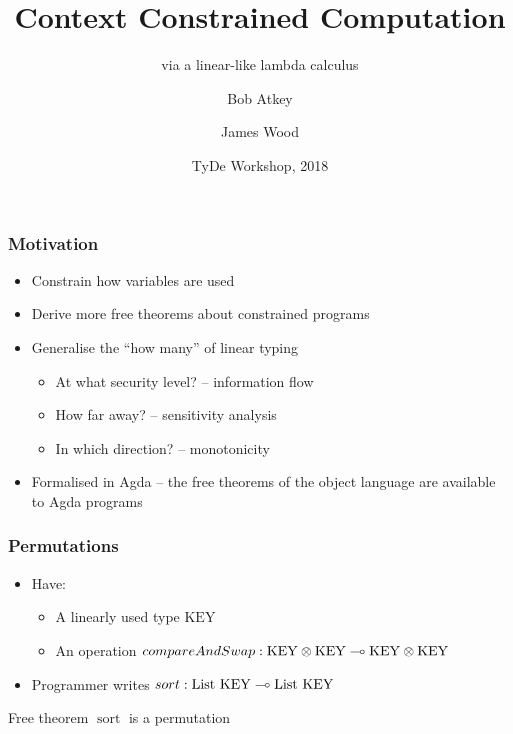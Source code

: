 \documentclass[fleqn]{beamer}
\title{Context Constrained Computation}
\subtitle{via a linear-like lambda calculus}
\author{Bob Atkey\inst{1} \and James Wood\inst{1}}
\institute{\inst{1}University of Strathclyde}
\date{TyDe Workshop, 2018}
\begin{document}
  \setlength{\abovedisplayskip}{0pt}
  \frame{\titlepage}
  \begin{frame}
    \frametitle{Motivation}

    \begin{itemize}
    \item Constrain how variables are used \pause
    \item Derive more free theorems about constrained programs \pause
    \item Generalise the ``how many'' of linear typing \pause
      \begin{itemize}
      \item At what security level? -- information flow \pause
      \item How far away? -- sensitivity analysis \pause
      \item In which direction? -- monotonicity \pause
      \end{itemize}
    \item Formalised in Agda -- the free theorems of the object language are
      available to Agda programs
    \end{itemize}
  \end{frame}
  \begin{frame}
    \frametitle{Permutations}
    \newcommand{\KEY}{\mathrm{KEY}}
    \begin{itemize}
    \item Have: \pause
      \begin{itemize}
      \item A linearly used type $\KEY$ \pause
      \item An operation $\mathop{compareAndSwap} : \fun{\tensor{\KEY}{\KEY}}{\tensor{\KEY}{\KEY}}$ \pause
      \end{itemize}
    \item Programmer writes $\mathop{sort} : \fun{\mathrm{List}~\KEY}{\mathrm{List}~\KEY}$ \pause
    \end{itemize}
    \begin{block}{Free theorem}
      $\mathop{sort}$ is a permutation
    \end{block}
  \end{frame}
\end{document}
